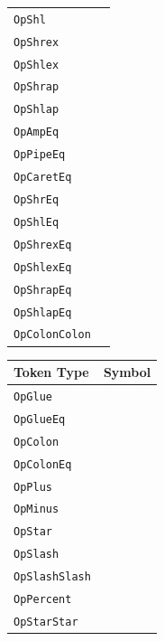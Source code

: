 \begin{table}[h]
{\begin{tabular}[t]{ll}
        \texttt{OpShl} & \op{<\textasciitilde} \\
        \texttt{OpShrex} & \op{\textasciitilde\textasciitilde>} \\
        \texttt{OpShlex} & \op{<\textasciitilde\textasciitilde} \\
        \texttt{OpShrap} & \op{>\textasciitilde>} \\
        \texttt{OpShlap} & \op{<\textasciitilde<} \\
        \hline
        \texttt{OpAmpEq} & \op{\&=} \\
        \texttt{OpPipeEq} & \op{|=} \\
        \texttt{OpCaretEq} & \op{\textasciicircum=} \\
        \texttt{OpShrEq} & \op{\textasciitilde>=} \\
        \texttt{OpShlEq} & \op{<\textasciitilde=} \\
        \texttt{OpShrexEq} & \op{\textasciitilde\textasciitilde>=} \\
        \texttt{OpShlexEq} & \op{<\textasciitilde\textasciitilde=} \\
        \texttt{OpShrapEq} & \op{>\textasciitilde>=} \\
        \texttt{OpShlapEq} & \op{<\textasciitilde<=} \\
        \hline
        \texttt{OpColonColon} & \op{::} \\
        \hline
    \end{tabular}
}
\hfill
\parbox[t]{0.45\linewidth}{
    \centering
    \begin{tabular}[t]{ll}
        \hline
        \textbf{Token Type} & \textbf{Symbol} \\
        \hline
        \texttt{OpGlue} & \op{<>} \\
        \texttt{OpGlueEq} & \op{<>=} \\
        \texttt{OpColon} & \op{:} \\
        \texttt{OpColonEq} & \op{:=} \\
        \hline
        \texttt{OpPlus} & \op{+} \\
        \texttt{OpMinus} & \op{-} \\
        \texttt{OpStar} & \op{*} \\
        \texttt{OpSlash} & \op{/} \\
        \texttt{OpSlashSlash} & \op{//} \\
        \texttt{OpPercent} & \op{\%} \\
        \texttt{OpStarStar} & \op{**} \\

\end{tabular}}
\end{table}
